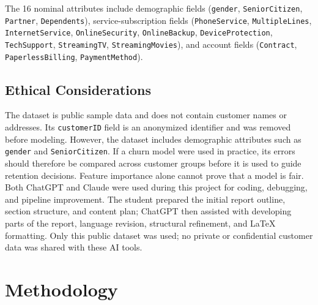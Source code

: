\documentclass[conference]{IEEEtran}
\begin{document}
	The 16 nominal attributes include demographic fields (\texttt{gender}, \texttt{SeniorCitizen}, \texttt{Partner}, \texttt{Dependents}), service-subscription fields (\texttt{PhoneService}, \texttt{MultipleLines}, \texttt{InternetService}, \texttt{OnlineSecurity}, \texttt{OnlineBackup}, \texttt{DeviceProtection}, \texttt{TechSupport}, \texttt{StreamingTV}, \texttt{StreamingMovies}), and account fields (\texttt{Contract}, \texttt{PaperlessBilling}, \texttt{PaymentMethod}).
	
	\subsection{Ethical Considerations}
	The dataset is public sample data and does not contain customer names or addresses. Its \texttt{customerID} field is an anonymized identifier and was removed before modeling. However, the dataset includes demographic attributes such as \texttt{gender} and \texttt{SeniorCitizen}. If a churn model were used in practice, its errors should therefore be compared across customer groups before it is used to guide retention decisions. Feature importance alone cannot prove that a model is fair. Both ChatGPT and Claude were used during this project for coding, debugging, and pipeline improvement. The student prepared the initial report outline, section structure, and content plan; ChatGPT then assisted with developing parts of the report, language revision, structural refinement, and LaTeX formatting. Only this public dataset was used; no private or confidential customer data was shared with these AI tools.
	
	\section{Methodology}
	\label{sec:methodology}
	
\end{document}
